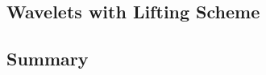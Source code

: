 \documentclass{article}
\begin{document}
\pagebreak
\subsection*{Wavelets with Lifting Scheme}

\pagebreak
\subsection*{Summary}
\end{document}
